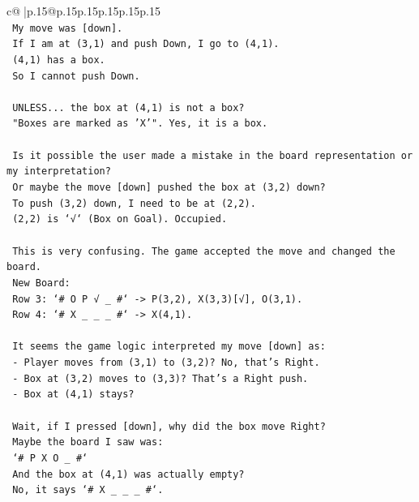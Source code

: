 \documentclass{article}
\begin{document}
{\begin{supertabular}{c@{$\;$}|p{.15\linewidth}@{}p{.15\linewidth}p{.15\linewidth}p{.15\linewidth}p{.15\linewidth}p{.15\linewidth}}
{{{\\ 
\texttt{      My move was {[}down{]}.} \\
\texttt{      If I am at (3,1) and push Down, I go to (4,1).} \\
\texttt{      (4,1) has a box.} \\
\texttt{      So I cannot push Down.} \\
\\ 
\texttt{      UNLESS... the box at (4,1) is not a box?} \\
\texttt{      "Boxes are marked as 'X'". Yes, it is a box.} \\
\\ 
\texttt{      Is it possible the user made a mistake in the board representation or my interpretation?} \\
\texttt{      Or maybe the move {[}down{]} pushed the box at (3,2) down?} \\
\texttt{      To push (3,2) down, I need to be at (2,2).} \\
\texttt{      (2,2) is `√` (Box on Goal). Occupied.} \\
\\ 
\texttt{      This is very confusing. The game accepted the move and changed the board.} \\
\texttt{      New Board:} \\
\texttt{      Row 3: `\# O P √ \_ \#` {-}> P(3,2), X(3,3){[}√{]}, O(3,1).} \\
\texttt{      Row 4: `\# X \_ \_ \_ \#` {-}> X(4,1).} \\
\\ 
\texttt{      It seems the game logic interpreted my move {[}down{]} as:} \\
\texttt{      {-} Player moves from (3,1) to (3,2)? No, that's Right.} \\
\texttt{      {-} Box at (3,2) moves to (3,3)? That's a Right push.} \\
\texttt{      {-} Box at (4,1) stays?} \\
\\ 
\texttt{      Wait, if I pressed {[}down{]}, why did the box move Right?} \\
\texttt{      Maybe the board I saw was:} \\
\texttt{      `\# P X O \_ \#`} \\
\texttt{      And the box at (4,1) was actually empty?} \\
\texttt{      No, it says `\# X \_ \_ \_ \#`.} \\
\\ 
}}}
\end{supertabular}}
\end{document}

